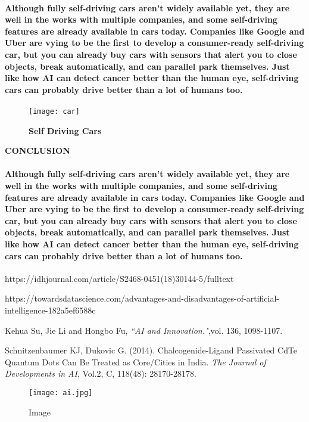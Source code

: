 \documentclass{article}
\begin{document}
	\paragraph{ Although fully self-driving cars aren’t widely available yet, they are well in the works with multiple companies, and some self-driving features are already available in cars today. Companies like Google and Uber are vying to be the first to develop a consumer-ready self-driving car, but you can already buy cars with sensors that alert you to close objects, break automatically, and can parallel park themselves. Just like how AI can detect cancer better than the human eye, self-driving cars can probably drive better than a lot of humans too.}
\begin{figure}[H]
\centering
\texttt{[image: car]}
\caption{{\large \textbf{Self Driving Cars}}}
\end{figure} 
\newpage		
\begin{LARGE}\begin{center} \textbf{CONCLUSION} \end{center}\end{LARGE}
\paragraph{Although fully self-driving cars aren’t widely available yet, they are well in the works with multiple companies, and some self-driving features are already available in cars today. Companies like Google and Uber are vying to be the first to develop a consumer-ready self-driving car, but you can already buy cars with sensors that alert you to close objects, break automatically, and can parallel park themselves. Just like how AI can detect cancer better than the human eye, self-driving cars can probably drive better than a lot of humans too.}
\begin{thebibliography}{100} 

\bibitem{}https://idhjournal.com/article/S2468-0451(18)30144-5/fulltext

\bibitem{} https://towardsdatascience.com/advantages-and-disadvantages-of-artificial-intelligence-182a5ef6588c

\bibitem{} Kehua Su, Jie Li and Hongbo Fu, \emph{“AI and Innovation."},vol.  136, 1098-1107. 

 Schnitzenbaumer KJ, Dukovic G. (2014). Chalcogenide-Ligand  Passivated  CdTe  Quantum  Dots  Can  Be Treated  as  Core/Cities in India.  \emph{The Journal  of Developments in AI}, Vol.2, C, 118(48): 28170-28178. 
\end{thebibliography}

\newpage
\begin{figure}[htbp]
\centerline{\texttt{[image: ai.jpg]}}
\caption{Image}
\label{fig}
\end{figure}
\end{document}
